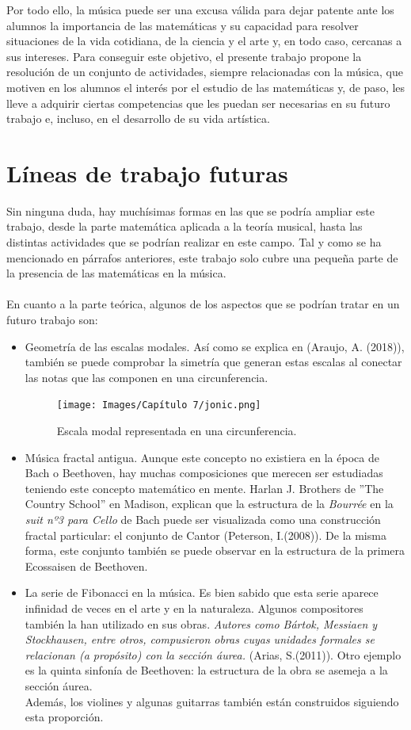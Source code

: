 \documentclass[a4paper, openright, 11pt, titlepage]{report}
\theoremstyle{definition}\newtheorem{defin}[propo]{Definition}
\theoremstyle{definition}\newtheorem{obser}[propo]{Remark}
\theoremstyle{definition}\newtheorem{ejem}[propo]{Ejemplo}
\theoremstyle{definition}\newtheorem{algoritmo}[propo]{Algoritmo}
\begin{document}
Por todo ello, la música puede ser una excusa válida para dejar patente ante los alumnos la importancia de las matemáticas y su capacidad para resolver situaciones de la vida cotidiana, de la ciencia y el arte y, en todo caso, cercanas a sus intereses. Para conseguir este objetivo, el presente trabajo propone la resolución de un conjunto de actividades, siempre relacionadas con la música, que motiven en los alumnos el interés por el estudio de las matemáticas y, de paso, les lleve a adquirir ciertas competencias que les puedan ser necesarias en su futuro trabajo e, incluso, en el desarrollo de su vida artística.
\section{Líneas de trabajo futuras}
Sin ninguna duda, hay muchísimas formas en las que se podría ampliar este trabajo, desde la parte matemática aplicada a la teoría musical, hasta las distintas actividades que se podrían realizar en este campo. Tal y como se ha mencionado en párrafos anteriores, este trabajo solo cubre una pequeña parte de la presencia de las matemáticas en la música.\\\\
En cuanto a la parte teórica, algunos de los aspectos que se podrían tratar en un futuro trabajo son: 
\begin{itemize}
    \item Geometría de las escalas modales. Así como se explica en \cite{futuras1} (Araujo, A. (2018)), también se puede comprobar la simetría que generan estas escalas al conectar las notas que las componen en una circunferencia.
    \begin{figure}[H]
        \centering
        \texttt{[image: Images/Capítulo 7/jonic.png]}
        \caption{Escala modal representada en una circunferencia.}
    \end{figure}
    \item Música fractal antigua. Aunque este concepto no existiera en la época de Bach o Beethoven, hay muchas composiciones que merecen ser estudiadas teniendo este concepto matemático en mente. Harlan J. Brothers de ''The Country School'' en Madison, explican que la estructura de la \textit{Bourrée} en la \textit{suit nº3 para Cello} de Bach puede ser visualizada como una construcción fractal particular: el conjunto de Cantor \cite{futuras2} (Peterson, I.(2008)). De la misma forma, este conjunto también se puede observar en la estructura de la primera Ecossaisen de Beethoven. 
    \item La serie de Fibonacci en la música. Es bien sabido que esta serie aparece infinidad de veces en el arte y en la naturaleza. Algunos compositores también la han utilizado en sus obras. \textit{Autores como Bártok, Messiaen y Stockhausen, entre otros, compusieron obras cuyas unidades formales se relacionan (a propósito) con la sección áurea.} \cite{futuras3} (Arias, S.(2011)). Otro ejemplo es la quinta sinfonía de Beethoven: la estructura de la obra se asemeja a la sección áurea.\\
    Además, los violines y algunas guitarras también están construidos siguiendo esta proporción. 
\end{itemize}
\end{document}
